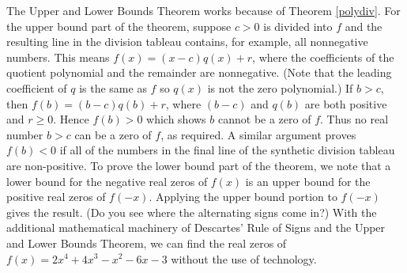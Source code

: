 {The Upper and Lower Bounds Theorem works because of Theorem \ref{polydiv}.  For the upper bound part of the theorem, suppose $c>0$ is divided into $f$ and the resulting line in the division tableau contains, for example, all nonnegative numbers.  This means $f(x) = (x-c) q(x) + r$, where the coefficients of the quotient polynomial and the remainder are nonnegative.  (Note that the leading coefficient of $q$ is the same as $f$ so $q(x)$ is not the zero polynomial.)  If $b > c$, then $f(b) = (b-c) q(b) + r$, where $(b-c)$ and  $q(b)$ are both positive and $r \geq 0$.  Hence $f(b) > 0$ which shows $b$ cannot be a zero of $f$.  Thus no real number $b > c$ can be a zero of $f$, as required.  A similar argument proves $f(b) < 0$ if all of the numbers in the final line of the synthetic division tableau are non-positive.  To prove the lower bound part of the theorem, we note that a lower bound for the negative real zeros of $f(x)$ is an upper bound for the positive real zeros of $f(-x)$.  Applying the upper bound portion to $f(-x)$ gives the result.  (Do you see where the alternating signs come in?) With the additional mathematical machinery of Descartes' Rule of Signs and the Upper and Lower Bounds Theorem, we can find the real zeros of $f(x) = 2x^4+4x^3-x^2-6x-3$ without the use of technology.}{}

\medskip


